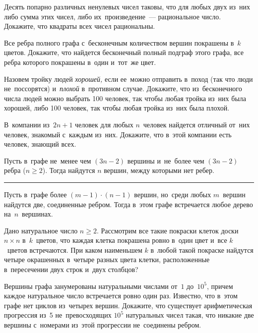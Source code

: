 \begin{problems}

\item
Десять попарно различных ненулевых чисел таковы, что для любых двух из~них либо
сумма этих чисел, либо их~произведение~--- рациональное число.
Докажите, что квадраты всех чисел рациональны.

\item
Все ребра полного графа с~бесконечным количеством вершин покрашены
в~$k$ цветов.
Докажите, что найдется бесконечный полный подграф этого графа, все ребра
которого покрашены в~один и~тот~же цвет.

\item
Назовем тройку людей \emph{хорошей,} если ее~можно отправить в~поход
(так что люди не~поссорятся) и~\emph{плохой} в~противном случае.
Докажите, что из~бесконечного числа людей можно выбрать 100 человек, так чтобы
любая тройка из~них была хорошей, либо 100 человек, так чтобы любая тройка
из~них была плохой.

\item
В~компании из~$2 n + 1$ человек для любых $n$~человек найдется отличный от~них
человек, знакомый с~каждым из~них.
Докажите, что в~этой компании есть человек, знающий всех.

\item
Пусть в~графе не~менее чем $(3 n - 2)$ вершины и~не~более чем $(3 n - 2)$ ребра
($n \geq 2$).
Тогда найдутся $n$ вершин, между которыми нет ребер.

\end{problems}

\medskip
\hrule

\begin{problems}

\item
Пусть в~графе более $(m - 1) \cdot (n - 1)$ вершин, но~среди любых $m$~вершин
найдутся две, соединенные ребром.
Тогда в~этом графе встречается любое дерево на~$n$~вершинах.

\item
Дано натуральное число $n \geq 2$.
Рассмотрим все такие покраски клеток доски $n \times n$ в~$k$~цветов, что
каждая клетка покрашена ровно в~один цвет и~все $k$~цветов встречаются.
При каком наименьшем $k$ в~любой такой покраске найдутся четыре окрашенных
в~четыре разных цвета клетки, расположенные в~пересечении двух строк и~двух
столбцов?

\item
Вершины графа занумерованы натуральными числами от~$1$ до~$10^5$, причем каждое
натуральное число встречается ровно один раз.
Известно, что в~этом графе нет циклов из~четырех вершин.
Докажите, что существует арифметическая прогрессия из~5 не~превосходящих $10^5$
натуральных чисел такая, что никакие две вершины с~номерами из~этой прогрессии
не~соединены ребром.

\end{problems}

